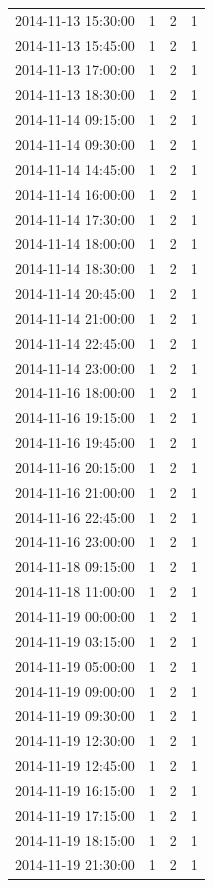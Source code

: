 \begin{tabular}{lrrr}
2014-11-13 15:30:00 & 1 & 2 & 1 \\
2014-11-13 15:45:00 & 1 & 2 & 1 \\
2014-11-13 17:00:00 & 1 & 2 & 1 \\
2014-11-13 18:30:00 & 1 & 2 & 1 \\
2014-11-14 09:15:00 & 1 & 2 & 1 \\
2014-11-14 09:30:00 & 1 & 2 & 1 \\
2014-11-14 14:45:00 & 1 & 2 & 1 \\
2014-11-14 16:00:00 & 1 & 2 & 1 \\
2014-11-14 17:30:00 & 1 & 2 & 1 \\
2014-11-14 18:00:00 & 1 & 2 & 1 \\
2014-11-14 18:30:00 & 1 & 2 & 1 \\
2014-11-14 20:45:00 & 1 & 2 & 1 \\
2014-11-14 21:00:00 & 1 & 2 & 1 \\
2014-11-14 22:45:00 & 1 & 2 & 1 \\
2014-11-14 23:00:00 & 1 & 2 & 1 \\
2014-11-16 18:00:00 & 1 & 2 & 1 \\
2014-11-16 19:15:00 & 1 & 2 & 1 \\
2014-11-16 19:45:00 & 1 & 2 & 1 \\
2014-11-16 20:15:00 & 1 & 2 & 1 \\
2014-11-16 21:00:00 & 1 & 2 & 1 \\
2014-11-16 22:45:00 & 1 & 2 & 1 \\
2014-11-16 23:00:00 & 1 & 2 & 1 \\
2014-11-18 09:15:00 & 1 & 2 & 1 \\
2014-11-18 11:00:00 & 1 & 2 & 1 \\
2014-11-19 00:00:00 & 1 & 2 & 1 \\
2014-11-19 03:15:00 & 1 & 2 & 1 \\
2014-11-19 05:00:00 & 1 & 2 & 1 \\
2014-11-19 09:00:00 & 1 & 2 & 1 \\
2014-11-19 09:30:00 & 1 & 2 & 1 \\
2014-11-19 12:30:00 & 1 & 2 & 1 \\
2014-11-19 12:45:00 & 1 & 2 & 1 \\
2014-11-19 16:15:00 & 1 & 2 & 1 \\
2014-11-19 17:15:00 & 1 & 2 & 1 \\
2014-11-19 18:15:00 & 1 & 2 & 1 \\
2014-11-19 21:30:00 & 1 & 2 & 1 \\

\end{tabular}
